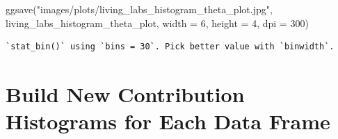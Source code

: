 \documentclass[
  letterpaper,
  DIV=11,
  numbers=noendperiod]{scrreprt}
\newenvironment{Shaded}{\begin{snugshade}}{\end{snugshade}}
\newcommand{\AttributeTok}[1]{\textcolor[rgb]{0.40,0.45,0.13}{#1}}
\newcommand{\DecValTok}[1]{\textcolor[rgb]{0.68,0.00,0.00}{#1}}
\newcommand{\FunctionTok}[1]{\textcolor[rgb]{0.28,0.35,0.67}{#1}}
\newcommand{\NormalTok}[1]{\textcolor[rgb]{0.00,0.23,0.31}{#1}}
\newcommand{\StringTok}[1]{\textcolor[rgb]{0.13,0.47,0.30}{#1}}
\begin{document}
\begin{Shaded}
\begin{Highlighting}[]
\FunctionTok{ggsave}\NormalTok{(}\StringTok{"images/plots/living\_labs\_histogram\_theta\_plot.jpg"}\NormalTok{, living\_labs\_histogram\_theta\_plot, }\AttributeTok{width =} \DecValTok{6}\NormalTok{, }\AttributeTok{height =} \DecValTok{4}\NormalTok{, }\AttributeTok{dpi =} \DecValTok{300}\NormalTok{)}
\end{Highlighting}
\end{Shaded}

\begin{verbatim}
`stat_bin()` using `bins = 30`. Pick better value with `binwidth`.
\end{verbatim}

\hypertarget{build-new-contribution-histograms-for-each-data-frame}{%
\section{Build New Contribution Histograms for Each Data
Frame}\label{build-new-contribution-histograms-for-each-data-frame}}
\end{document}
